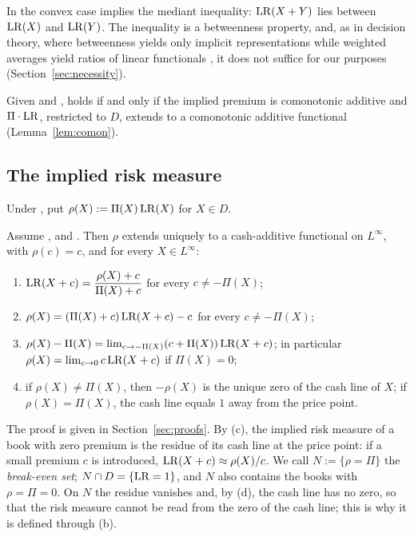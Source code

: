 In the convex case \axCM{} implies the mediant inequality: $\mathrm{LR}(X+Y)$ lies between $\mathrm{LR}(X)$ and $\mathrm{LR}(Y)$. The
inequality is a betweenness property, and, as in decision theory, where betweenness yields only
implicit representations while weighted averages yield ratios of linear functionals
\citep{chew1983,dekel1986}, it does not suffice for our purposes (Section~\ref{sec:necessity}).

Given \axP{} and \axN, \axCM{} holds if and only if the implied premium is comonotonic additive and
$\Pi\cdot\mathrm{LR}$, restricted to $D$, extends to a comonotonic additive functional (Lemma~\ref{lem:comon}).

\subsection{The implied risk measure}\label{sec:implied-risk}

\begin{definition}\label{def:impliedrisk}
Under \axP, put $\rho(X):=\Pi(X)\,\mathrm{LR}(X)$ for $X\in D$.
\end{definition}

\begin{proposition}\label{prop:readings}
Assume \axP, \axN{} and \axCM. Then $\rho$ extends uniquely to a cash-additive functional on $L^\infty$, with
$\rho(c)=c$, and for every $X\in L^\infty$:
\begin{enumerate}[label=(\alph*),nosep]
\item $\mathrm{LR}(X+c)=\dfrac{\rho(X)+c}{\Pi(X)+c}$ for every $c\neq-\Pi(X)$;
\item $\rho(X)=(\Pi(X)+c)\,\mathrm{LR}(X+c)-c$ for every $c\neq-\Pi(X)$;
\item $\rho(X)-\Pi(X)=\lim_{c\to-\Pi(X)}(c+\Pi(X))\,\mathrm{LR}(X+c)$; in particular $\rho(X)=\lim_{c\to0}c\,\mathrm{LR}(X+c)$
  if $\Pi(X)=0$;
\item if $\rho(X)\ne\Pi(X)$, then $-\rho(X)$ is the unique zero of the cash line of $X$; if $\rho(X)=\Pi(X)$, the
  cash line equals $1$ away from the price point.
\end{enumerate}
\end{proposition}

The proof is given in Section~\ref{sec:proofs}. By (c), the implied risk measure of a book with zero premium is
the residue of its cash line at the price point: if a small premium $c$ is introduced, $\mathrm{LR}(X+c)\approx\rho(X)/c$.
We call $N:=\{\rho=\Pi\}$ the \emph{break-even set}; $N\cap D=\{\mathrm{LR}=1\}$, and $N$ also contains the books with
$\rho=\Pi=0$. On $N$ the residue vanishes and, by (d), the cash line has no zero, so that the risk measure cannot
be read from the zero of the cash line; this is why it is defined through (b).

